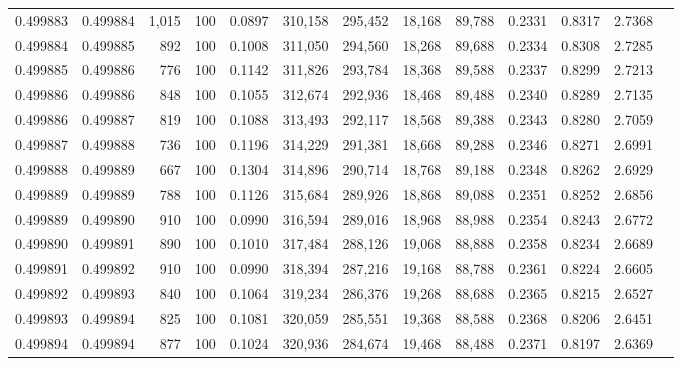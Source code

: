 \begin{tabular}{rrrrrrrrrrrrr}
0.499883 & 0.499884 & 1,015 & 100 &                                     0.0897 & 310,158 & 295,452 &  18,168 &  89,788 & 0.2331 & 0.8317 & 2.7368 \\
0.499884 & 0.499885 &   892 & 100 &                                     0.1008 & 311,050 & 294,560 &  18,268 &  89,688 & 0.2334 & 0.8308 & 2.7285 \\
0.499885 & 0.499886 &   776 & 100 &                                     0.1142 & 311,826 & 293,784 &  18,368 &  89,588 & 0.2337 & 0.8299 & 2.7213 \\
0.499886 & 0.499886 &   848 & 100 &                                     0.1055 & 312,674 & 292,936 &  18,468 &  89,488 & 0.2340 & 0.8289 & 2.7135 \\
0.499886 & 0.499887 &   819 & 100 &                                     0.1088 & 313,493 & 292,117 &  18,568 &  89,388 & 0.2343 & 0.8280 & 2.7059 \\
0.499887 & 0.499888 &   736 & 100 &                                     0.1196 & 314,229 & 291,381 &  18,668 &  89,288 & 0.2346 & 0.8271 & 2.6991 \\
0.499888 & 0.499889 &   667 & 100 &                                     0.1304 & 314,896 & 290,714 &  18,768 &  89,188 & 0.2348 & 0.8262 & 2.6929 \\
0.499889 & 0.499889 &   788 & 100 &                                     0.1126 & 315,684 & 289,926 &  18,868 &  89,088 & 0.2351 & 0.8252 & 2.6856 \\
0.499889 & 0.499890 &   910 & 100 &                                     0.0990 & 316,594 & 289,016 &  18,968 &  88,988 & 0.2354 & 0.8243 & 2.6772 \\
0.499890 & 0.499891 &   890 & 100 &                                     0.1010 & 317,484 & 288,126 &  19,068 &  88,888 & 0.2358 & 0.8234 & 2.6689 \\
0.499891 & 0.499892 &   910 & 100 &                                     0.0990 & 318,394 & 287,216 &  19,168 &  88,788 & 0.2361 & 0.8224 & 2.6605 \\
0.499892 & 0.499893 &   840 & 100 &                                     0.1064 & 319,234 & 286,376 &  19,268 &  88,688 & 0.2365 & 0.8215 & 2.6527 \\
0.499893 & 0.499894 &   825 & 100 &                                     0.1081 & 320,059 & 285,551 &  19,368 &  88,588 & 0.2368 & 0.8206 & 2.6451 \\
0.499894 & 0.499894 &   877 & 100 &                                     0.1024 & 320,936 & 284,674 &  19,468 &  88,488 & 0.2371 & 0.8197 & 2.6369 \\

\end{tabular}
